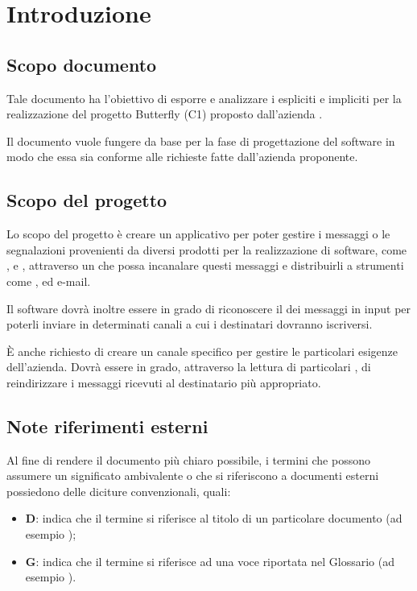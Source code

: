 \section{Introduzione}

	\subsection{Scopo documento}
	Tale documento ha l'obiettivo di esporre e analizzare i  espliciti e impliciti per la realizzazione del progetto Butterfly (C1) proposto dall'azienda \II.

	Il documento vuole fungere da base per la fase di progettazione del software in modo che essa sia conforme alle richieste fatte dall'azienda proponente.

	\subsection{Scopo del progetto}
	Lo scopo del progetto è creare un applicativo per poter gestire i messaggi o le segnalazioni provenienti da diversi prodotti per la realizzazione di software,
	come ,  e , attraverso un  che possa incanalare questi messaggi e distribuirli a strumenti come
	,  ed e-mail.

	Il software dovrà inoltre essere in grado di riconoscere il  dei messaggi in input per poterli inviare in determinati canali a cui i destinatari dovranno
	iscriversi.

	\`E anche richiesto di creare un canale specifico per gestire le particolari esigenze dell'azienda. Dovrà essere in grado, attraverso la lettura di particolari	, di reindirizzare i messaggi ricevuti al destinatario più appropriato.

	\subsection{Note riferimenti esterni}
	Al fine di rendere il documento più chiaro possibile, i termini che possono assumere un significato ambivalente o che si riferiscono a documenti esterni
	possiedono delle diciture convenzionali, quali:

	\begin{itemize}
		\item \textbf{D}: indica che il termine si riferisce al titolo di un particolare documento (ad esempio \Doc{\PdPv});
		\item \textbf{G}: indica che il termine si riferisce ad una voce riportata nel Glossario (ad esempio ).
	\end{itemize}

